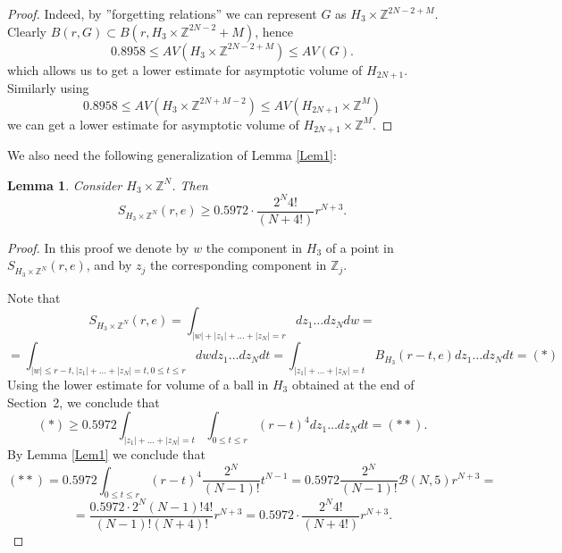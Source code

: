 \documentclass[11pt]{article}
\newcounter{razdel}[section]
\theoremstyle{Mystyle}
\newtheorem{Lemma}[razdel]{Lemma}
\begin{document}
\begin{proof}
 Indeed, by ''forgetting relations'' we can represent $G$  as
$H_{3}\times \mathbb{Z}^{2N-2 + M}$. Clearly
$B(r,G)\subset B(r, H_{3}\times \mathbb{Z}^{2N-2} + M)$, hence 
$$0.8958\leq AV(H_{3}\times \mathbb{Z}^{2N-2 + M})\leq AV(G).$$
which allows us to get a lower estimate for asymptotic volume of $H_{2N+1}$.
Similarly using
$$0.8958\leq AV(H_{3}\times \mathbb{Z}^{2N+M-2})\leq AV(H_{2N+1}\times \mathbb{Z}^{M})$$
we can get a lower estimate for asymptotic volume of $H_{2N+1}\times \mathbb{Z}^M$.
\end{proof}

%
%
%
%

We also need the following generalization of Lemma \ref{Lem1}:

\begin{Lemma}
Consider $H_3\times \mathbb{Z}^{N}$. Then
$$S_{H_3\times \mathbb{Z}^{N}}(r,e)\geq 0.5972\cdot \frac{2^{N} 4!}{(N+4!)}r^{N+3}.$$
\end{Lemma}

\begin{proof}

In this proof we denote by $w$ the component in $H_{3}$ of a point in $S_{H_{3}\times \mathbb{Z}^{N}}(r,e)$, and by $z_{j}$ the corresponding component in $\mathbb{Z}_{j}$. 

Note that
$$S_{H_{3}\times \mathbb{Z}^{N}}(r,e) = \int_{|w| + |z_1| + \ldots + |z_{N}| = r} dz_{1}\ldots dz_{N} dw = $$
$$=\int_{|w|\leq r - t, |z_{1}| + \ldots + |z_{N}| = t, 0\leq t\leq r} dw dz_{1}\ldots dz_{N} dt = \int_{|z_{1}| + \ldots + |z_{N}| = t} B_{H_{3}}(r-t, e)dz_{1}\ldots dz_{N} dt=(*)$$
Using the lower estimate for volume of a ball in $H_3$ obtained at the end of Section~2, we conclude that
$$(*)\geq 0.5972 \int_{|z_{1}| + \ldots + |z_{N}| = t}\int_{0\leq t\leq r} (r-t)^4 dz_{1}\ldots dz_{N} dt = (**).$$
By Lemma \ref{Lem1} we conclude that
$$(**)=0.5972\int_{0\leq t\leq r} (r-t)^4\frac{2^N}{(N-1)!}t^{N-1} = 0.5972\frac{2^{N}}{(N-1)!} \mathcal{B}(N, 5) r^{N+3}=$$
$$=\frac{0.5972\cdot 2^{N} (N-1)! 4!}{(N-1)!(N+4)!}r^{N+3}=0.5972\cdot \frac{2^{N} 4!}{(N+4!)}r^{N+3}.$$ 


\end{proof}
\end{document}
